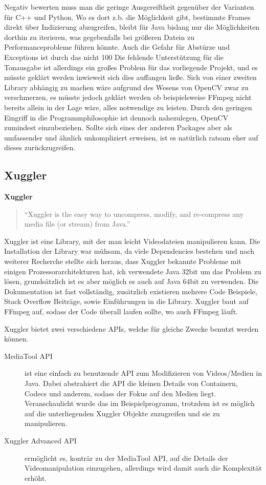 Negativ bewerten muss man die geringe Ausgereiftheit gegenüber der Varianten für C++ und Python. Wo es dort z.b. die Möglichkeit gibt, bestimmte Frames direkt über Indizierung abzugreifen, bleibt für Java bislang nur die Möglichkeiten dorthin zu iterieren, was gegebenfalls bei größeren Datein zu Performanceprobleme führen könnte. Auch die Gefahr für Abstürze und Exceptions ist durch das nicht 100%
Die fehlende Unterstützung für die Tonausgabe ist allerdings ein großes Problem für das vorliegende Projekt, und es müsste geklärt werden inwieweit sich dies auffangen ließe. Sich von einer zweiten Library abhängig zu machen wäre aufgrund des Wesens von OpenCV zwar zu verschmerzen, es müsste jedoch geklärt werden ob beispielsweise FFmpeg nicht bereits allein in der Lage wäre, alles notwendige zu leisten. Durch den geringen Eingriff in die Programmphilosophie ist dennoch nahezulegen, OpenCV  zumindest einzubeziehen. Sollte sich eines der anderen Packages aber als umfassender und ähnlich unkompliziert erweisen, ist es natürlich ratsam eher auf dieses zurückzugreifen. 

\newpage
\subsection{Xuggler}
\textbf{Xuggler}
\begin{quote}
“Xuggler is the easy way to uncompress, modify, and re-compress any media file (or stream) from Java.”\cite{xuggle_def}
\end{quote}
Xuggler ist eine Library, mit der man leicht Videodateien manipulieren kann. Die Installation der Library war mühsam, da viele Dependencies bestehen und nach weiterer Recherche stellte sich heraus, dass Xuggler bekannte Probleme mit einigen Prozessorarchitekturen hat, ich verwendete Java 32bit um das Problem zu lösen, grundsätzlich ist es aber möglich es auch auf Java 64bit zu verwenden. Die Dokumentation ist fast vollständig, zusätzlich existieren mehrere Code Beispiele, Stack Overflow Beiträge, sowie Einführungen in die Library. Xuggler baut auf FFmpeg auf, sodass der Code überall laufen sollte, wo auch FFmpeg läuft.

Xuggler bietet zwei verschiedene APIs, welche für gleiche Zwecke benutzt werden können.
\begin{description}
	\item [MediaTool API] ist eine einfach zu benutzende API zum Modifizieren von Videos/Medien in Java. Dabei abstrahiert die API die kleinen Details von Containern, Codecs und anderem, sodass der Fokus auf den Medien liegt.
	Veranschaulicht wurde das im Beispielprogramm, trotzdem ist es möglich auf die unterliegenden Xuggler Objekte zuzugreifen und sie zu manipulieren.
	\item [Xuggler Advanced API] ermöglicht es, konträr zu der MediaTool API, auf die Details der Videomanipulation einzugehen, allerdings wird damit auch die Komplexität erhöht.
\end{description}


